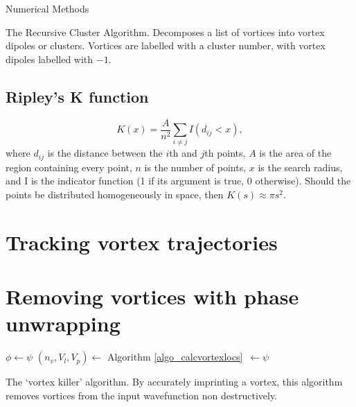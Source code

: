 \begin{chapter}{\label{cha:numerics}Numerical Methods}
\begin{algorithm}[H]
		\caption{The Recursive Cluster Algorithm. Decomposes a list of vortices into vortex dipoles or clusters. Vortices are labelled with a cluster number, with vortex dipoles labelled with $-1$.}\label{algo_rca
		}
		\end{algorithm}


	\subsection{\label{section:ripleysk} Ripley's K function }
		\begin{equation}\label{eq:ripleysk}
		K(x) = \frac{A}{n^2}\sum\limits_{i \ne j} I\left (d_{ij}<x\right ),
		\end{equation}
		where $d_{ij}$ is the distance between the $i$th and $j$th points, $A$ is the area of the region containing every point, $n$ is the number of points, $x$ is the search radius, and I is the indicator function (1 if its argument is true, 0 otherwise). Should the points be distributed homogeneously in space, then $K(s)\approx\pi s^2$.
\section{\label{section:vortextracking} Tracking vortex trajectories}
\section{\label{section:vortexremoval} Removing vortices with phase unwrapping}
	\begin{algorithm}[H]
	\BlankLine
	$\phi \leftarrow \psi$\;
	$(n_v,V_l,V_p)\leftarrow$ Algorithm \ref{algo_calcvortexlocs}~$\leftarrow\psi$\;


	\caption{The `vortex killer' algorithm. By accurately imprinting a vortex, this algorithm removes vortices from the input wavefunction non destructively.}\label{algo_vortexkiller}
	\end{algorithm}

\end{chapter}
